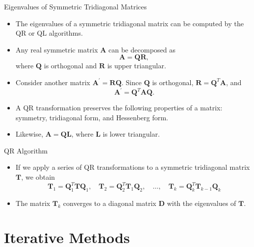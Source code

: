 \documentclass{beamer}
\begin{document}
\begin{frame}{Eigenvalues of Symmetric Tridiagonal Matrices}
    \begin{itemize}
        \item The eigenvalues of a symmetric tridiagonal matrix can be computed by the QR or QL algorithms.
        \item Any real symmetric matrix $\mathbf{A}$ can be decomposed as 
        \[
        \mathbf{A}= \mathbf{Q} \mathbf{R},
        \]
        where $\mathbf{Q}$ is orthogonal and $\mathbf{R}$ is upper triangular.
    \item Consider another matrix $\mathbf{A}^\prime=\mathbf{R} \mathbf{Q}$. Since $\mathbf{Q}$ is orthogonal, 
    $\mathbf{R}= \mathbf{Q}^T \mathbf{A}$, and 
     \[
     \mathbf{A}^\prime =\mathbf{Q}^T \mathbf{A} \mathbf{Q}.
     \]
     \item A QR transformation preserves the following properties of
     a matrix: symmetry, tridiagonal form, and Hessenberg form.
     \item Likewise, $\mathbf{A}=\mathbf{Q} \mathbf{L}$, where $\mathbf{L}$ is lower triangular.
    \end{itemize}
\end{frame}
\begin{frame}{QR Algorithm }
\begin{itemize}
    \item If we apply a series of QR transformations to a symmetric tridiagonal matrix $\mathbf{T}$, we obtain
    \[  
    \mathbf{T}_1=\mathbf{Q}_1^T \mathbf{T} \mathbf{Q}_1, \quad \mathbf{T}_2=\mathbf{Q}_2^T \mathbf{T}_1 \mathbf{Q}_2, \quad \ldots, \quad \mathbf{T}_k=\mathbf{Q}_k^T \mathbf{T}_{k-1} \mathbf{Q}_k
\]
\item The matrix $\mathbf{T}_k$ converges to a diagonal matrix $\mathbf{D}$ with the eigenvalues of $\mathbf{T}$.
\end{itemize}
\end{frame}
\section{Iterative Methods}
\end{document}
